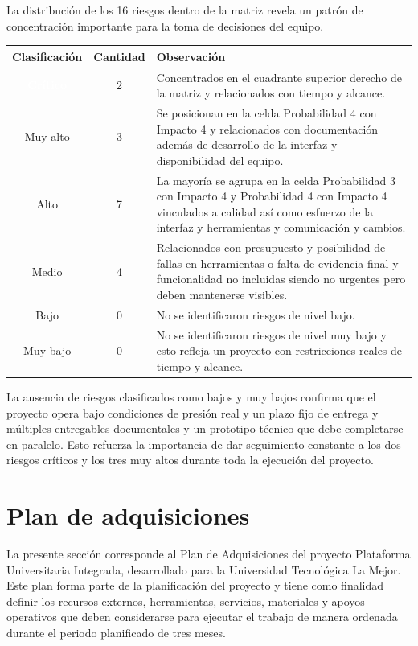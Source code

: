 \documentclass[11pt,spanish]{article}
\begin{document}
La distribución de los 16 riesgos dentro de la matriz revela un patrón de concentración importante para la toma de decisiones del equipo.

\begin{table}[H]
\centering
\begin{tabularx}{\textwidth}{c c Y}
\toprule
\textbf{Clasificación} & \textbf{Cantidad} & \textbf{Observación} \\
\midrule
{}\textcolor{white}{\textbf{Crítico}} & 2 & Concentrados en el cuadrante superior derecho de la matriz y relacionados con tiempo y alcance. \\
 Muy alto & 3 & Se posicionan en la celda Probabilidad 4 con Impacto 4 y relacionados con documentación además de desarrollo de la interfaz y disponibilidad del equipo. \\
 Alto & 7 & La mayoría se agrupa en la celda Probabilidad 3 con Impacto 4 y Probabilidad 4 con Impacto 4 vinculados a calidad así como esfuerzo de la interfaz y herramientas y comunicación y cambios. \\
 Medio & 4 & Relacionados con presupuesto y posibilidad de fallas en herramientas o falta de evidencia final y funcionalidad no incluidas siendo no urgentes pero deben mantenerse visibles. \\
 Bajo & 0 & No se identificaron riesgos de nivel bajo. \\
 Muy bajo & 0 & No se identificaron riesgos de nivel muy bajo y esto refleja un proyecto con restricciones reales de tiempo y alcance. \\
\bottomrule
\end{tabularx}
\end{table}

La ausencia de riesgos clasificados como bajos y muy bajos confirma que el proyecto opera bajo condiciones de presión real y un plazo fijo de entrega y múltiples entregables documentales y un prototipo técnico que debe completarse en paralelo. Esto refuerza la importancia de dar seguimiento constante a los dos riesgos críticos y los tres muy altos durante toda la ejecución del proyecto.

\newpage
\section{Plan de adquisiciones}

La presente sección corresponde al Plan de Adquisiciones del proyecto Plataforma Universitaria Integrada, desarrollado para la Universidad Tecnológica La Mejor. Este plan forma parte de la planificación del proyecto y tiene como finalidad definir los recursos externos, herramientas, servicios, materiales y apoyos operativos que deben considerarse para ejecutar el trabajo de manera ordenada durante el periodo planificado de tres meses.
\end{document}
